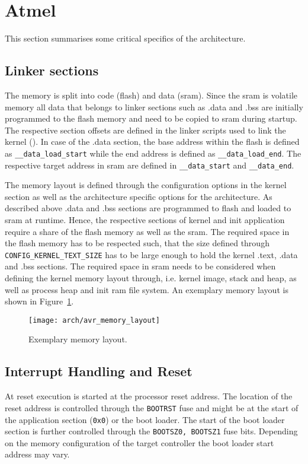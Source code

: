 %
%
%



\section{Atmel \avr}
	This section summarises some critical specifics of the \avr architecture.

	\subsection{Linker sections}
		The \avr memory is split into code (flash) and data (\gls{sram}). Since the \gls{sram} is volatile memory all data that belongs to linker sections such as .data and .bss are initially programmed to the flash memory and need to be copied to \gls{sram} during startup. The respective section offsets are defined in the linker scripts used to link the kernel (). In case of the .data section, the base address within the flash is defined as \lstinline{__data_load_start} while the end address is defined as \lstinline{__data_load_end}. The respective target address in \gls{sram} are defined in \lstinline{__data_start} and \lstinline{__data_end}.

		The memory layout is defined through the configuration options in the kernel section as well as the architecture specific options for the \avr architecture. As described above .data and .bss sections are programmed to flash and loaded to \gls{sram} at runtime. Hence, the respective sections of kernel and init application require a share of the flash memory as well as the \gls{sram}. The required space in the flash memory has to be respected such, that the size defined through \lstinline{CONFIG_KERNEL_TEXT_SIZE} has to be large enough to hold the kernel .text, .data and .bss sections. The required space in \gls{sram} needs to be considered when defining the kernel memory layout through, i.e. kernel image, stack and heap, as well as process heap and init ram file system. An exemplary memory layout is shown in Figure~\ref{fig:avr_memory_layout}.
		\begin{figure}[h]
			\centering	
			\texttt{[image: arch/avr\_memory\_layout]}
			\caption{Exemplary \avr memory layout.}
			\label{fig:avr_memory_layout}
		\end{figure}

	\subsection{Interrupt Handling and Reset}
		At reset execution is started at the processor reset address. The location of the reset address is controlled through the \lstinline{BOOTRST} fuse and might be at the start of the application section (\lstinline{0x0}) or the boot loader. The start of the boot loader section is further controlled through the \lstinline{BOOTSZ0, BOOTSZ1} fuse bits. Depending on the memory configuration of the target controller the boot loader start address may vary.
		
